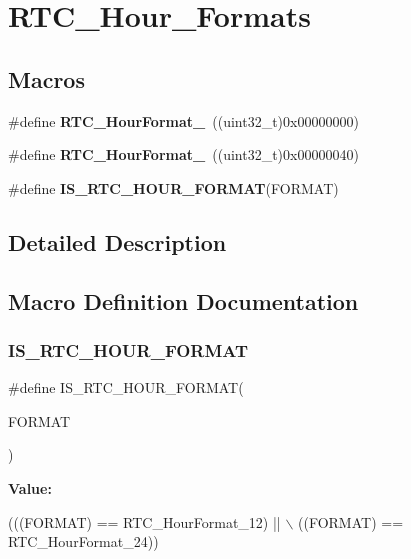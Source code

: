 \section{R\+T\+C\+\_\+\+Hour\+\_\+\+Formats}
\label{group__RTC__Hour__Formats}
\subsection*{Macros}
\begin{DoxyCompactItemize}
\item 
\#define \textbf{ R\+T\+C\+\_\+\+Hour\+Format\+\_}~((uint32\+\_\+t)0x00000000)
\item 
\#define \textbf{ R\+T\+C\+\_\+\+Hour\+Format\+\_}~((uint32\+\_\+t)0x00000040)
\item 
\#define \textbf{ I\+S\+\_\+\+R\+T\+C\+\_\+\+H\+O\+U\+R\+\_\+\+F\+O\+R\+M\+AT}(F\+O\+R\+M\+AT)
\end{DoxyCompactItemize}


\subsection{Detailed Description}


\subsection{Macro Definition Documentation}
\mbox{\label{group__RTC__Hour__Formats_ga597042eec4479e028c32973bc69f4a26}} 
\subsubsection{I\+S\+\_\+\+R\+T\+C\+\_\+\+H\+O\+U\+R\+\_\+\+F\+O\+R\+M\+AT}
{\footnotesize\ttfamily \#define I\+S\+\_\+\+R\+T\+C\+\_\+\+H\+O\+U\+R\+\_\+\+F\+O\+R\+M\+AT(\begin{DoxyParamCaption}\item[{}]{F\+O\+R\+M\+AT }\end{DoxyParamCaption})}

{\bfseries Value\+:}
\begin{DoxyCode}
(((FORMAT) == RTC_HourFormat_12) || \(\backslash\)
                                        ((FORMAT) == RTC_HourFormat_24))
\end{DoxyCode}


